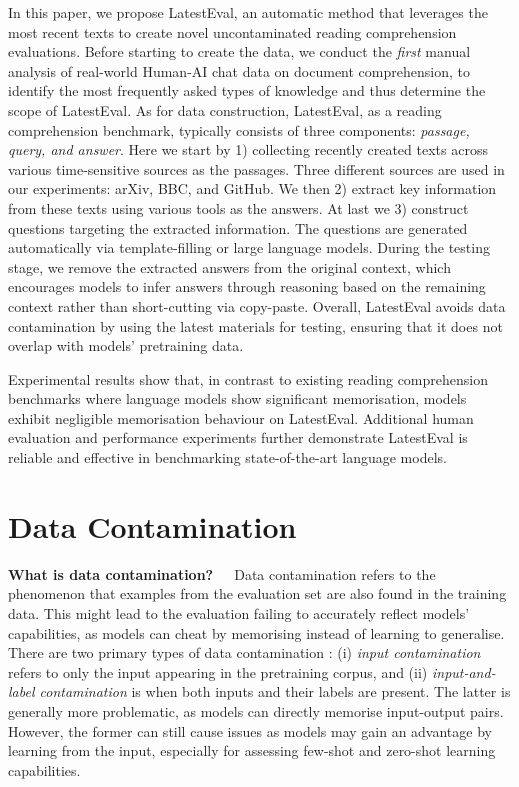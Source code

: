 \documentclass[letterpaper]{article} %
\begin{document}
In this paper, we propose LatestEval, an automatic method that leverages the most recent texts to create novel uncontaminated reading comprehension evaluations. Before starting to create the data, we conduct the \textit{first} manual analysis of real-world Human-AI chat data on document comprehension, to identify the most frequently asked types of knowledge and thus determine the scope of LatestEval.
As for data construction, LatestEval, as a reading comprehension benchmark, typically consists of three components: \textit{passage, query, and answer}. Here we start by 1) collecting recently created texts across various time-sensitive sources as the passages. Three different sources are used in our experiments: arXiv, BBC, and GitHub. We then 2) extract key information from these texts using various tools as the answers. At last we 3) construct questions targeting the extracted information. The questions are generated automatically via template-filling or large language models. During the testing stage, we remove the extracted answers from the original context, which encourages models to infer answers through reasoning based on the remaining context rather than short-cutting via copy-paste. Overall, LatestEval avoids data contamination by using the latest materials for testing, ensuring that it does not overlap with models' pretraining data.

Experimental results show that, in contrast to existing reading comprehension benchmarks where language models show significant memorisation, models exhibit negligible memorisation behaviour on LatestEval. Additional human evaluation and performance experiments further demonstrate LatestEval is reliable and effective in benchmarking state-of-the-art language models.

\section{Data Contamination}

\noindent\textbf{What is data contamination?}~~~Data contamination refers to the phenomenon that examples from the evaluation set are also found in the training data. This might lead to the evaluation failing to accurately reflect models' capabilities, as models can cheat by memorising instead of learning to generalise. There are two primary types of data contamination \cite{dodge2021documenting}: (i) \textit{input contamination} refers to only the input appearing in the pretraining corpus, and (ii) \textit{input-and-label contamination} is when both inputs and their labels are present. The latter is generally more problematic, as models can directly memorise input-output pairs. However, the former can still cause issues as models may gain an advantage by learning from the input,
especially for assessing few-shot and zero-shot learning capabilities.
\end{document}
